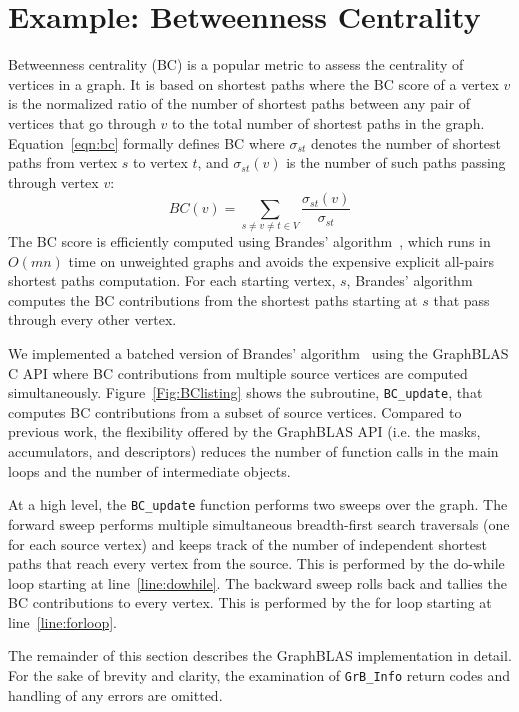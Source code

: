 \section{Example: Betweenness Centrality}
\label{sec:example}

Betweenness centrality (BC) is a popular metric to assess the centrality of 
vertices in a graph. It is based on shortest paths where the BC score of a
vertex $v$ is the normalized ratio of the number of shortest paths between 
any pair of vertices that go through $v$ to the total number of shortest paths 
in the graph.  Equation~\ref{eqn:bc} formally defines BC where $\sigma_{st}$ 
denotes the number of shortest paths from vertex $s$ to vertex $t$, and 
$\sigma_{st}(v)$ is the number of such paths passing through vertex $v$:
\begin{equation}
	BC(v) = \sum_{s \neq v \neq t \in V} \frac{\sigma_{st}(v)}{\sigma_{st}}
\label{eqn:bc}
\end{equation}
The BC score is efficiently computed using Brandes' 
algorithm~\cite{brandes2001faster}, 
which runs in $O(mn)$ time on unweighted graphs and avoids the expensive 
explicit all-pairs shortest paths computation.  For each starting vertex, $s$, 
Brandes' algorithm computes the BC contributions from the shortest paths starting
at $s$ that pass through every other vertex.

We implemented a batched version of Brandes' 
algorithm~\cite{combblas,bader2006designing,robinson2011complex} using 
the GraphBLAS C API where BC contributions from multiple 
source vertices are computed simultaneously. 
Figure~\ref{Fig:BClisting} shows the subroutine, {\tt BC\_update}, that computes
BC contributions from a subset of source vertices. Compared to previous work, the 
flexibility offered by the GraphBLAS API (i.e. the masks, accumulators, 
and descriptors) reduces  the number of function calls in the main loops and the
number of intermediate objects.

At a high level, the {\tt BC\_update} function performs two sweeps over the 
graph. The forward sweep performs multiple simultaneous
breadth-first search traversals (one for each source vertex) and keeps track 
of the number of independent shortest paths that reach every vertex from 
the source.  This is performed by the do-while loop starting at 
line~\ref{line:dowhile}. The backward sweep rolls back and tallies the BC 
contributions to every vertex. This is performed by the for loop starting 
at line~\ref{line:forloop}.  

The remainder of this section describes the 
GraphBLAS implementation in detail.  
For the sake of brevity and clarity, the examination of 
{\tt GrB\_Info} return codes and handling of any errors are omitted.


